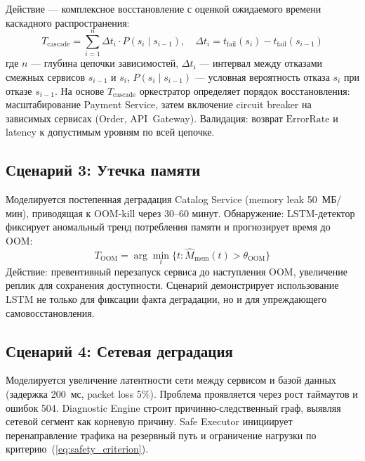 Действие --- комплексное восстановление с оценкой ожидаемого времени каскадного распространения:
\begin{equation}
T_{\text{cascade}} = \sum_{i=1}^{n} \Delta t_i \cdot P(s_i \mid s_{i-1}), \quad \Delta t_i = t_{\text{fail}}(s_i) - t_{\text{fail}}(s_{i-1})
\label{eq:cascade_time}
\end{equation}
где $n$ --- глубина цепочки зависимостей, $\Delta t_i$ --- интервал между отказами смежных сервисов $s_{i-1}$ и $s_i$, $P(s_i \mid s_{i-1})$ --- условная вероятность отказа $s_i$ при отказе $s_{i-1}$. На основе $T_{\text{cascade}}$ оркестратор определяет порядок восстановления: масштабирование Payment Service, затем включение circuit breaker на зависимых сервисах (Order, API~Gateway). Валидация: возврат $\text{ErrorRate}$ и latency к допустимым уровням по всей цепочке.

\subsection{Сценарий 3: Утечка памяти}

Моделируется постепенная деградация Catalog Service (memory leak 50~МБ/мин), приводящая к OOM-kill через 30--60 минут. Обнаружение: LSTM-детектор фиксирует аномальный тренд потребления памяти и прогнозирует время до OOM:
\begin{equation}
T_{\text{OOM}} = \arg\min_t \{t : \hat{M}_{\text{mem}}(t) > \theta_{\text{OOM}}\}
\label{eq:degradation_prediction_proto}
\end{equation}
Действие: превентивный перезапуск сервиса до наступления OOM, увеличение реплик для сохранения доступности. Сценарий демонстрирует использование LSTM не только для фиксации факта деградации, но и для упреждающего самовосстановления.

\subsection{Сценарий 4: Сетевая деградация}

Моделируется увеличение латентности сети между сервисом и базой данных (задержка 200~мс, packet loss 5\%). Проблема проявляется через рост таймаутов и ошибок 504. Diagnostic Engine строит причинно-следственный граф, выявляя сетевой сегмент как корневую причину. Safe Executor инициирует перенаправление трафика на резервный путь и ограничение нагрузки по критерию~(\ref{eq:safety_criterion}).

